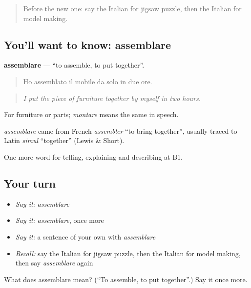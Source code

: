 \label{lesson:IT-C505-assemblare}



\begin{quote}
Before the new one: say the Italian for jigsaw puzzle, then the Italian for model making.
\end{quote}

\subsection*{You'll want to know: assemblare}
\textbf{assemblare} — \textquotedblleft{}to assemble, to put together\textquotedblright{}.

\begin{quote}
Ho assemblato il mobile da solo in due ore.
\end{quote}

\begin{quote}
\emph{I put the piece of furniture together by myself in two hours.}
\end{quote}

For furniture or parts; \emph{montare} means the same in speech.

\begin{cousinweb}
\emph{assemblare} came from French \emph{assembler} \textquotedblleft{}to bring together\textquotedblright{}, usually traced to Latin \emph{simul} \textquotedblleft{}together\textquotedblright{} (Lewis \& Short).
\end{cousinweb}

\begin{grammarlens}[title={What you've built}]
One more word for telling, explaining and describing at B1.
\end{grammarlens}

\subsection*{Your turn}
\begin{itemize}
\raggedright
  \item \emph{Say it:} \emph{assemblare}
  \item \emph{Say it:} \emph{assemblare}, once more
  \item \emph{Say it:} a sentence of your own with \emph{assemblare}
  \item \emph{Recall:} say the Italian for jigsaw puzzle, then the Italian for model making, then say \emph{assemblare} again
\end{itemize}

\begin{tcolorbox}[breakable,colback=teal!4,colframe=teal!35!black,title={Before you move on}]
What does assemblare mean? (\textquotedblleft{}To assemble, to put together\textquotedblright{}.) Say it once more.
\end{tcolorbox}
